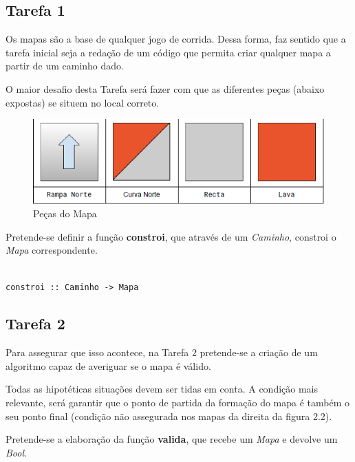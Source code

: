 \documentclass[a4paper]{report} %
\begin{document}
\subsection{Tarefa 1}

 Os mapas são a base de qualquer jogo de corrida. Dessa forma, faz sentido que a tarefa inicial seja a redação de um código que permita criar qualquer mapa a partir de um caminho dado.
 
 O maior desafio desta Tarefa será fazer com que as diferentes peças (abaixo expostas) se situem no local correto.
 
 \begin{figure} [!htb]
     
     \centering
     \includegraphics[scale = 0.8]{Imagens/pecas.png}
     \caption{Peças do Mapa}

  \end{figure}
 
 Pretende-se definir a função \textbf{constroi}, que através de um \emph{Caminho}, constroi o \emph{Mapa} correspondente.
 
 \begin{verbatim}

constroi :: Caminho -> Mapa

 \end{verbatim}
 
 \newpage
 
 \subsection{Tarefa 2}
 
 Para assegurar que isso acontece, na Tarefa 2 pretende-se a criação de um algoritmo capaz de averiguar se o mapa é válido.
 
 Todas as hipotéticas situações devem ser tidas em conta. A condição mais relevante, será garantir que o ponto de partida da formação do mapa é também o seu ponto final (condição não assegurada nos mapas da direita da figura 2.2).
 
 Pretende-se a elaboração da função \textbf{valida}, que recebe um \emph{Mapa} e devolve um \emph{Bool}.
 
\end{document}
